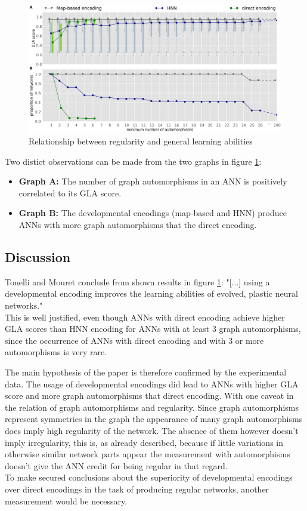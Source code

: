 \documentclass[12pt,twoside]{article}
\theoremstyle{plain}
\theoremstyle{definition}
\theoremstyle{remark}
\begin{document}
\begin{figure}[h]
	\begin{center}
		\includegraphics[width=1.2\textwidth]{results.png}
	\end{center}
	\caption{Relationship between regularity and general learning abilities}
	\label{fig:results}
\end{figure}

Two distict observations can be made from the two graphs in figure \ref{fig:results}:
\begin{itemize}
	\item \textbf{Graph A:} The number of graph automorphisms in an ANN is positively correlated to its GLA score. 
	\item \textbf{Graph B:} The developmental encodings (map-based and HNN) produce ANNs with more graph automorphisms that the direct encoding.
\end{itemize}

\subsection{Discussion}
Tonelli and Mouret conclude from shown results in figure \ref{fig:results}: "[...] using a developmental encoding improves the learning abilities of evolved, plastic neural networks."\\
This is well justified, even though ANNs with direct encoding achieve higher GLA scores than HNN encoding for ANNs with at least 3 graph automorphisms, since the occurrence of ANNs with direct encoding and with 3 or more automorphisms is very rare.\medskip

The main hypothesis of the paper is therefore confirmed by the experimental data. The usage of developmental encodings did lead to ANNs with higher GLA score and more graph automorphisms that direct encoding. 
With one caveat in the relation of graph automorphisms and regularity. Since graph automorphisms represent symmetries in the graph the appearance of many graph automorphisms does imply high regularity of the network. The absence of them however doesn't imply irregularity, this is, as already described, because if little variations in otherwise similar network parts appear the measurement with automorphisms doesn't give the ANN credit for being regular in that regard.\\
To make secured conclusions about the superiority of developmental encodings over direct encodings in the task of producing regular networks, another measurement would be necessary. \medskip
\end{document}
